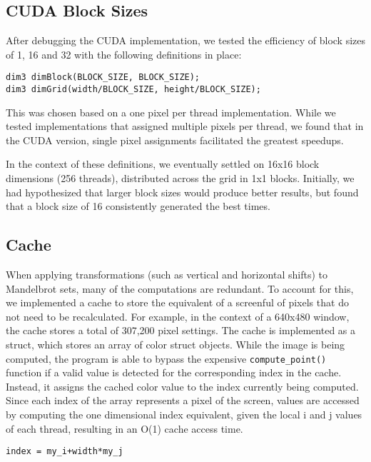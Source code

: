 \documentclass{article}
\begin{document}
\subsection{CUDA Block Sizes}

After debugging the CUDA implementation, we tested the efficiency of block 
sizes of 1, 16 and 32 with the following definitions in place: 

\begin{verbatim}
dim3 dimBlock(BLOCK_SIZE, BLOCK_SIZE); 
dim3 dimGrid(width/BLOCK_SIZE, height/BLOCK_SIZE);
\end{verbatim}

This was chosen based on a one pixel per thread implementation.
While we tested implementations that assigned multiple pixels per thread, 
we found that in the CUDA version, single pixel assignments facilitated the
greatest speedups.

In the context of these definitions, we eventually settled on 16x16 block 
dimensions (256 threads), distributed across the grid in 1x1 blocks.
Initially, we had hypothesized that larger block sizes would produce better
results, but found that a block size of 16 consistently generated the best 
times.

\subsection{Cache}

When applying transformations (such as vertical and horizontal shifts) to
Mandelbrot sets, many of the computations are redundant.
To account for this, we implemented a cache to store the equivalent of a
screenful of pixels that do not need to be recalculated.
For example, in the context of a 640x480 window, the cache stores a total 
of 307,200 pixel settings.
The cache is implemented as a struct, which stores an array of color struct
objects.
While the image is being computed, the program is able to bypass the 
expensive \verb|compute_point()| function if a valid value is detected for
the corresponding index in the cache.
Instead, it assigns the cached color value to the index currently being 
computed.
Since each index of the array represents a pixel of the screen, values are
accessed by computing the one dimensional index equivalent, given the local
i and j values of each thread, resulting in an O(1) cache access time.

\begin{verbatim}
index = my_i+width*my_j
\end{verbatim}
\end{document}

